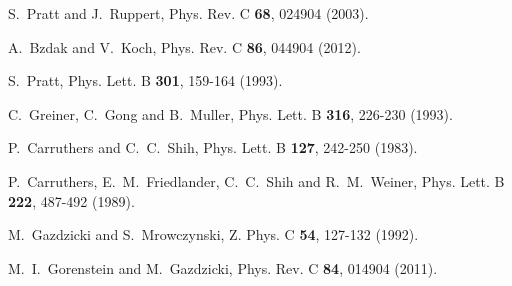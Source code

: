 \begin{thebibliography}{99}
S.~Pratt and J.~Ruppert,
Phys. Rev. C \textbf{68}, 024904 (2003).


A.~Bzdak and V.~Koch,
Phys. Rev. C \textbf{86}, 044904 (2012).

S.~Pratt,
Phys. Lett. B \textbf{301}, 159-164 (1993).

C.~Greiner, C.~Gong and B.~Muller,
Phys. Lett. B \textbf{316}, 226-230 (1993).

P.~Carruthers and C.~C.~Shih,
Phys. Lett. B \textbf{127}, 242-250 (1983).

P.~Carruthers, E.~M.~Friedlander, C.~C.~Shih and R.~M.~Weiner,
Phys. Lett. B \textbf{222}, 487-492 (1989).

M.~Gazdzicki and S.~Mrowczynski,
Z. Phys. C \textbf{54}, 127-132 (1992).

M.~I.~Gorenstein and M.~Gazdzicki,
Phys. Rev. C \textbf{84}, 014904 (2011).


\end{thebibliography}

